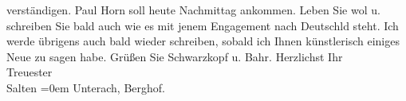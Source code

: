 \begin{ledgroupsized}[t]{13cm}
               verständigen. Paul{ }{\pb}Horn soll heute Nachmittag ankommen. Leben Sie wol u.
               schreiben Sie bald auch wie es mit jenem Engagement nach Deutschld steht. \pend
           \pstart
           Ich werde übrigens auch bald wieder schreiben, sobald ich Ihnen künstlerisch ei{\pb}niges Neue zu sagen habe. Grüßen
               Sie Schwarzkopf u. Bahr.\pend
           \pstart
           Herzlichst Ihr
               {\\[\baselineskip]}Treuester
               {\\[\baselineskip]}\spacefill\mbox{Salten}\pend
           \leftskip=0em{}\pstart
           \noindent{}Unterach, Berghof.
               \pend
           
         
         \endnumbering{}\end{ledgroupsized}\begin{anhang}\end{anhang}\newcommand{\dateiname}{L03111}\newcommand{\titel}{Felix Salten an Arthur Schnitzler, 8. 8. 1892}\newcommand{\editorInnen}{Martin Anton Müller und Laura Untner}
      
